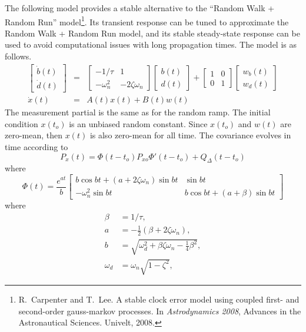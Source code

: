 The following model provides a stable alternative to the ``Random Walk + Random Run'' model\footnote{R.~Carpenter and T.~Lee. A stable clock error model using coupled first- and second-order gauss-markov processes. In {\em Astrodynamics 2008}, Advances in the Astronautical Sciences. Univelt, 2008.}.  Its transient response can be tuned to approximate the Random Walk + Random Run model, and its stable steady-state response can be used to avoid computational issues with long propagation times.  The model is as follows.
\begin{eqnarray}
	\begin{bmatrix} \dot{b}(t) \\ \dot{d}(t) \end{bmatrix} &=&
	\begin{bmatrix} -1/\tau & 1 \\ -\omega_n^2 & -2\zeta\omega_n \end{bmatrix}
	\begin{bmatrix} b(t) \\ d(t) \end{bmatrix} +
	\begin{bmatrix} 1 & 0 \\ 0 & 1 \end{bmatrix}
	\begin{bmatrix} w_b(t) \\ w_d(t) \end{bmatrix} \\
	\dot{x}(t) &=& A(t) x(t) + B(t) w(t)
\end{eqnarray}
The measurement partial is the same as for the random ramp.  The initial condition $x(t_o)$ is an unbiased random constant.  Since $x(t_o)$ and $w(t)$ are zero-mean, then $x(t)$ is also zero-mean for all time.  The covariance evolves in time according to
\begin{equation}
	P_x(t) = \Phi(t-t_o)P_{xo}\Phi'(t-t_o) + Q_\Delta(t-t_o)
\end{equation}
where
\begin{equation}
	\Phi(t) = \frac{e^{at}}{b}\left[\begin{array}{cc}
		b\cos bt + \left(a + 2\zeta\omega_n\right)\sin bt & \sin bt \\
		-\omega_n^2\sin bt & b\cos bt + \left(a + \beta\right)\sin bt
	\end{array}\right]
\end{equation}
where
\begin{align}
	\beta &= 1/\tau, \\
	a &= -\frac{1}{2}\left(\beta + 2\zeta\omega_n\right), \\
	b &= \sqrt{\omega_d^2 + \beta\zeta\omega_n - \frac{1}{4}\beta^2}, \\
	\omega_d &= \omega_n\sqrt{1 - \zeta^2},
\end{align}
